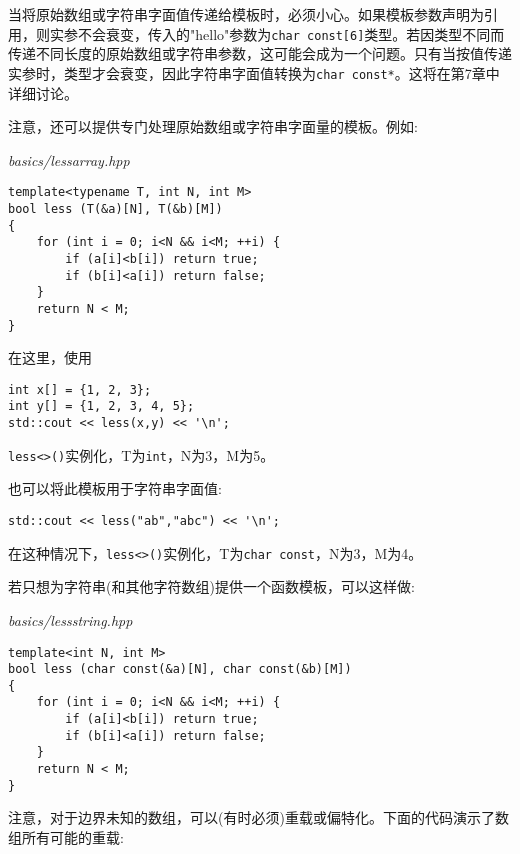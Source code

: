 当将原始数组或字符串字面值传递给模板时，必须小心。如果模板参数声明为引用，则实参不会衰变，传入的"hello"参数为\texttt{char const[6]}类型。若因类型不同而传递不同长度的原始数组或字符串参数，这可能会成为一个问题。只有当按值传递实参时，类型才会衰变，因此字符串字面值转换为\texttt{char const*}。这将在第7章中详细讨论。

注意，还可以提供专门处理原始数组或字符串字面量的模板。例如:

\noindent
\textit{basics/lessarray.hpp}
\begin{lstlisting}[style=styleCXX]
template<typename T, int N, int M>
bool less (T(&a)[N], T(&b)[M])
{
	for (int i = 0; i<N && i<M; ++i) {
		if (a[i]<b[i]) return true;
		if (b[i]<a[i]) return false;
	}
	return N < M;
}
\end{lstlisting}

在这里，使用

\begin{lstlisting}[style=styleCXX]
int x[] = {1, 2, 3};
int y[] = {1, 2, 3, 4, 5};
std::cout << less(x,y) << '\n';
\end{lstlisting}

\texttt{less<>()}实例化，T为\texttt{int}，N为3，M为5。

也可以将此模板用于字符串字面值:

\begin{lstlisting}[style=styleCXX]
std::cout << less("ab","abc") << '\n';
\end{lstlisting}

在这种情况下，\texttt{less<>()}实例化，T为\texttt{char const}，N为3，M为4。

若只想为字符串(和其他字符数组)提供一个函数模板，可以这样做:

\noindent
\textit{basics/lessstring.hpp}
\begin{lstlisting}[style=styleCXX]
template<int N, int M>
bool less (char const(&a)[N], char const(&b)[M])
{
	for (int i = 0; i<N && i<M; ++i) {
		if (a[i]<b[i]) return true;
		if (b[i]<a[i]) return false;
	}
	return N < M;
}
\end{lstlisting}

注意，对于边界未知的数组，可以(有时必须)重载或偏特化。下面的代码演示了数组所有可能的重载:

